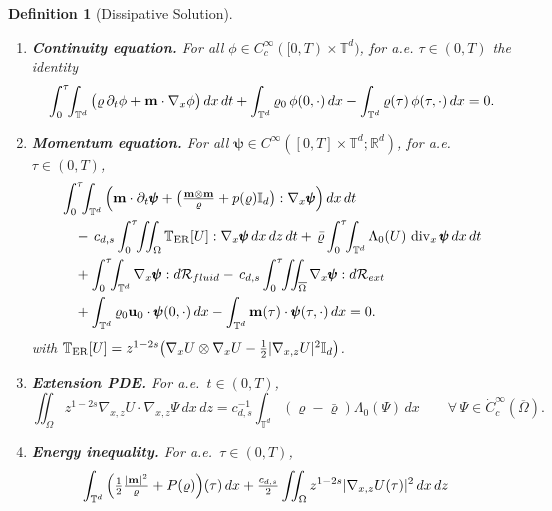 \documentclass[12pt,a4paper,twoside]{article}
\newcommand{\Div}{\operatorname{div}}
\newcommand{\vr}{\varrho}
\newcommand{\vu}{\vc{u}}
\newcommand{\vc}[1]{{\bf #1}}
\newcommand{\Grad}{\nabla}
\newtheorem{df}{Definition}
\numberwithin{equation}{section}%
\newcommand{\vm}{\vc{m}}
\begin{document}
\begin{df}[Dissipative Solution]
\begin{enumerate}[leftmargin=*]
			\item \textbf{Continuity equation.} For all $\phi\in C_c^\infty([0,T)\times\mathbb T^d)$, for a.e. $\tau \in (0,T)$ the identity 
			\begin{equation}\label{eq:w-ERc}
				\int_0^{\tau}\!\!\int_{\mathbb T^d}\big(\vr\,\partial_t\phi+\vm\cdot\Grad_x\phi\big)\,dx\,dt
				+\int_{\mathbb T^d}\vr_0\,\phi(0,\cdot)\,dx- \int_{\mathbb T^d}\vr(\tau)\,\phi(\tau,\cdot)\,dx=0.
			\end{equation}
		\item \textbf{Momentum equation.} For all $\pmb\psi\in C^\infty([0,T]\times\mathbb T^d;\mathbb R^d)$,
		for a.e.\ $\tau\in(0,T)$,
		\begin{equation}\label{eq:w-ERm}
			\begin{aligned}
				&\int_0^\tau\!\!\int_{\mathbb T^d}\Big(\vm\cdot\partial_t\pmb\psi
				+\big(\tfrac{\vm\otimes\vm}{\vr}+p(\vr)\mathbb I_d\big):\Grad_x\pmb\psi\Big)\,dx\,dt\\
				&\quad -\,c_{d,s}\int_0^\tau\!\!\iint_\Omega \mathbb T_{\rm ER}[U]:\Grad_x\pmb\psi\,dx\,dz\,dt
				+\,\bar\vr\int_0^\tau\!\!\int_{\mathbb T^d}\Lambda_0(U)\,\Div_x\pmb\psi\,dx\,dt\\
				&\quad +\int_0^\tau\!\!\int_{\mathbb T^d}\Grad_x\pmb\psi:d\mathcal R_{fluid}
				-\,c_{d,s}\int_0^\tau\!\!\iint_{\overline\Omega}\Grad_x\pmb\psi:d\mathcal R_{ext}\\
				&\quad +\int_{\mathbb T^d}\vr_0\vu_0\cdot\pmb\psi(0,\cdot)\,dx
				-\int_{\mathbb T^d}\vm(\tau)\cdot\pmb\psi(\tau,\cdot)\,dx
				= 0 .
			\end{aligned}
		\end{equation}
			with $\mathbb T_{\rm ER}[U]=z^{1-2s}\big(\Grad_xU\otimes\Grad_xU-\tfrac12|\Grad_{x,z}U|^2\mathbb I_d\big)$.
			\item \textbf{Extension PDE.} For a.e.\ $t\in(0,T)$,
			\begin{equation}\label{eq:w-ext}
				\iint_\Omega z^{1-2s}\Grad_{x,z}U\cdot\Grad_{x,z}\Psi\,dx\,dz
				=c_{d,s}^{-1}\int_{\mathbb T^d}(\vr-\bar\vr)\Lambda_0(\Psi)\,dx
				\qquad\forall\,\Psi\in\dot C_c^\infty(\overline\Omega).
			\end{equation}
			\item \textbf{Energy inequality.} For a.e.\ $\tau\in(0,T)$,
			\begin{equation}\label{eq:ei}
				\begin{aligned}
					&\int_{\mathbb T^d}\Big(\tfrac12\tfrac{|\vm|^2}{\vr}+P(\vr)\Big)(\tau)\,dx
					+\tfrac{c_{d,s}}2\iint_\Omega z^{1-2s}|\Grad_{x,z}U(\tau)|^2\,dx\,dz

\end{aligned}
\end{equation}
\end{enumerate}
\end{df}
\end{document}
